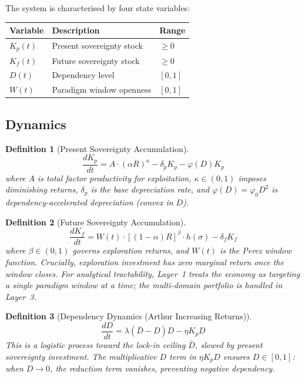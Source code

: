 \documentclass[11pt,a4paper]{article}
\newtheorem{definition}{Definition}
\theoremstyle{remark}
\begin{document}
The system is characterised by four state variables:

\begin{center}
\begin{tabular}{lll}
\toprule
\textbf{Variable} & \textbf{Description} & \textbf{Range} \\
\midrule
$K_p(t)$ & Present sovereignty stock & $\geq 0$ \\
$K_f(t)$ & Future sovereignty stock & $\geq 0$ \\
$D(t)$ & Dependency level & $[0, 1]$ \\
$W(t)$ & Paradigm window openness & $[0, 1]$ \\
\bottomrule
\end{tabular}
\end{center}

\subsection{Dynamics}

\begin{definition}[Present Sovereignty Accumulation]
\begin{equation}
\frac{dK_p}{dt} = A \cdot (\alpha R)^{\kappa} - \delta_p K_p - \varphi(D) K_p
\label{eq:kp}
\end{equation}
where $A$ is total factor productivity for exploitation, $\kappa \in (0,1)$ imposes diminishing returns, $\delta_p$ is the base depreciation rate, and $\varphi(D) = \varphi_0 D^2$ is dependency-accelerated depreciation (convex in $D$).
\end{definition}

\begin{definition}[Future Sovereignty Accumulation]
\begin{equation}
\frac{dK_f}{dt} = W(t) \cdot \left[(1-\alpha)R\right]^{\beta} \cdot h(\sigma) - \delta_f K_f
\label{eq:kf}
\end{equation}
where $\beta \in (0,1)$ governs exploration returns, and $W(t)$ is the Perez window function. Crucially, exploration investment has zero marginal return once the window closes. For analytical tractability, Layer~1 treats the economy as targeting a single paradigm window at a time; the multi-domain portfolio is handled in Layer~3.
\end{definition}

\begin{definition}[Dependency Dynamics (Arthur Increasing Returns)]
\begin{equation}
\frac{dD}{dt} = \lambda(\bar{D} - D)D - \eta K_p D
\label{eq:D}
\end{equation}
This is a logistic process toward the lock-in ceiling $\bar{D}$, slowed by present sovereignty investment. The multiplicative $D$ term in $\eta K_p D$ ensures $D \in [0,1]$: when $D \to 0$, the reduction term vanishes, preventing negative dependency.
\end{definition}
\end{document}
